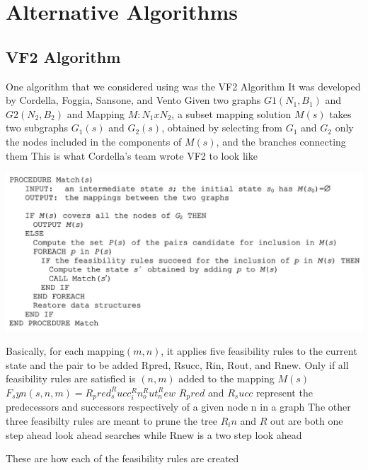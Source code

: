 \documentclass{article}
\begin{document}
\section{Alternative Algorithms}

  \subsection{VF2 Algorithm}

  One algorithm that we considered using was the VF2 Algorithm
  It was developed by Cordella, Foggia, Sansone, and Vento
  Given two graphs $G1(N_1,B_1)$ and $G2(N_2,B_2)$ and Mapping $M : N_1 x N_2$, a subset mapping solution $M(s)$ takes two subgraphs $G_1(s)$ and $G_2(s)$, obtained by selecting from $G_1$ and $G_2$
  only the nodes included in the components of $M(s)$, and the branches connecting them
  This is what Cordella's team wrote VF2 to look like

  \includegraphics{../images/vf2_rules.png}

  Basically, for each mapping$(m,n)$, it applies five feasibility rules to the current state and the pair to be added
  Rpred, Rsucc, Rin, Rout, and Rnew.
  Only if all feasibility rules are satisfied is $(n,m)$ added to the mapping $M(s)$
  $F_syn(s,n,m) = R_pred ^ R_succ ^ R_in ^ R_out ^ R_new$
  $R_pred$ and $R_succ$ represent the predecessors and successors respectively of a given node n in a graph
  The other three feasibilty rules are meant to prune the tree
  $R_in$ and $R$ out are both one step ahead look ahead searches while Rnew is a two step look ahead

  These are how each of the feasibility rules are created
\end{document}
